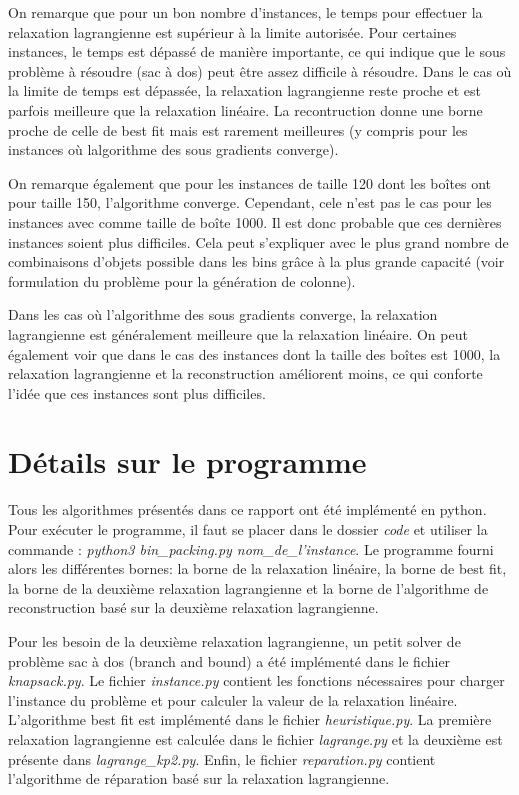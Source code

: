 \documentclass{article}
\begin{document}
On remarque que pour un bon nombre d'instances, le temps pour effectuer la relaxation lagrangienne est supérieur à la limite autorisée.
Pour certaines instances, le temps est dépassé de manière importante, ce qui indique que le sous problème à résoudre (sac à dos) peut être assez difficile à résoudre.
Dans le cas où la limite de temps est dépassée, la relaxation lagrangienne reste proche et est parfois meilleure que la relaxation linéaire.
La recontruction donne une borne proche de celle de best fit mais est rarement meilleures (y compris pour les instances où lalgorithme des sous gradients converge).\newline

On remarque également que pour les instances de taille 120 dont les boîtes ont pour taille 150, l'algorithme converge.
Cependant, cele n'est pas le cas pour les instances avec comme taille de boîte 1000.
Il est donc probable que ces dernières instances soient plus difficiles.
Cela peut s'expliquer avec le plus grand nombre de combinaisons d'objets possible dans les bins grâce à la plus grande capacité (voir formulation du problème pour la génération de colonne). \newline

Dans les cas où l'algorithme des sous gradients converge, la relaxation lagrangienne est généralement meilleure que la relaxation linéaire.
On peut également voir que dans le cas des instances dont la taille des boîtes est 1000, la relaxation lagrangienne et la reconstruction améliorent moins, ce qui conforte l'idée que ces instances sont plus difficiles.

\section{Détails sur le programme}

Tous les algorithmes présentés dans ce rapport ont été implémenté en python.
Pour exécuter le programme, il faut se placer dans le dossier \textit{code} et utiliser la commande : \textit{python3 bin\_packing.py nom\_de\_l'instance}.
Le programme fourni alors les différentes bornes: la borne de la relaxation linéaire, la borne de best fit, la borne de la deuxième relaxation lagrangienne et la borne de l'algorithme de reconstruction basé sur la deuxième relaxation lagrangienne.\newline

Pour les besoin de la deuxième relaxation lagrangienne, un petit solver de problème sac à dos (branch and bound) a été implémenté dans le fichier \textit{knapsack.py}.
Le fichier \textit{instance.py} contient les fonctions nécessaires pour charger l'instance du problème et pour calculer la valeur de la relaxation linéaire.
L'algorithme best fit est implémenté dans le fichier \textit{heuristique.py}.
La première relaxation lagrangienne est calculée dans le fichier \textit{lagrange.py} et la deuxième est présente dans \textit{lagrange\_kp2.py}.
Enfin, le fichier \textit{reparation.py} contient l'algorithme de réparation basé sur la relaxation lagrangienne.
\end{document}
